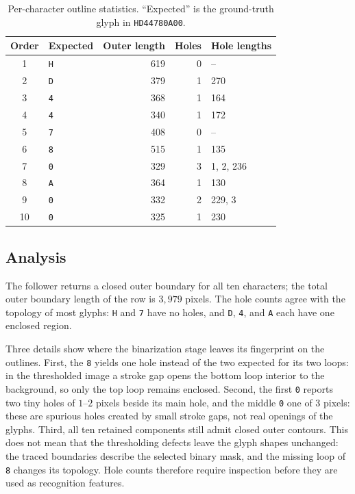 \begin{table}[!htbp]
  \centering
  \caption{Per-character outline statistics.  ``Expected'' is the ground-truth
  glyph in \texttt{HD44780A00}.}
  \label{tab:task5-outlines}
  \begin{tabular}{clrrl}
    \toprule
    Order & Expected & Outer length & Holes & Hole lengths \\
    \midrule
    1 & \texttt{H} & 619 & 0 & -- \\
    2 & \texttt{D} & 379 & 1 & 270 \\
    3 & \texttt{4} & 368 & 1 & 164 \\
    4 & \texttt{4} & 340 & 1 & 172 \\
    5 & \texttt{7} & 408 & 0 & -- \\
    6 & \texttt{8} & 515 & 1 & 135 \\
    7 & \texttt{0} & 329 & 3 & 1, 2, 236 \\
    8 & \texttt{A} & 364 & 1 & 130 \\
    9 & \texttt{0} & 332 & 2 & 229, 3 \\
    10 & \texttt{0} & 325 & 1 & 230 \\
    \bottomrule
  \end{tabular}
\end{table}

\subsection{Analysis}

The follower returns a closed outer boundary for all ten characters; the total
outer boundary length of the row is $3{,}979$ pixels.  The hole counts agree
with the topology of most glyphs: \texttt{H} and \texttt{7} have no holes, and
\texttt{D}, \texttt{4}, and \texttt{A} each have one enclosed region.

Three details show where the binarization stage leaves its fingerprint on the
outlines.  First, the \texttt{8} yields one hole instead of the two expected
for its two loops: in the thresholded image a stroke gap opens the bottom
loop interior to the background, so only the top loop remains enclosed.
Second, the first \texttt{0} reports two tiny holes of $1$--$2$ pixels beside
its main hole, and the middle \texttt{0} one of $3$ pixels: these are spurious
holes created by small stroke gaps, not real openings of the glyphs.  Third,
all ten retained components still admit closed outer contours.  This does
not mean that the thresholding defects leave the glyph shapes unchanged:
the traced boundaries describe the selected binary mask, and the missing
loop of \texttt{8} changes its topology.  Hole counts therefore require
inspection before they are used as recognition features.

